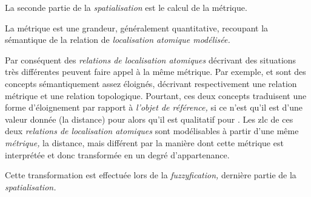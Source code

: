 %
La seconde partie de la \emph{spatialisation} est le calcul de la métrique.

La métrique est une grandeur, généralement quantitative, recoupant la sémantique de la relation de \emph{localisation atomique modélisée.}

Par conséquent des \emph{relations de localisation atomiques} décrivant des situations très différentes peuvent faire appel à la même métrique.
%
Par exemple,  et  sont des concepts sémantiquement assez éloignés, décrivant respectivement une relation métrique et une relation topologique. Pourtant, ces deux concepts traduisent une forme d'éloignement par rapport à \emph{l'objet de référence,} si ce n'est qu'il est d'une valeur donnée (\ie la distance) pour  alors qu'il est qualitatif pour . Les \ac{zlc} de ces deux \emph{relations de localisation atomiques} sont modélisables à partir d'une même \emph{métrique,} la distance, mais différent par la manière dont cette métrique est interprétée et donc transformée en un degré d'appartenance.

Cette transformation est effectuée lors de la \emph{fuzzyfication,} dernière partie de la \emph{spatialisation.} 


